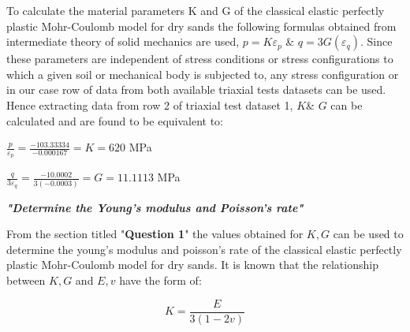 \documentclass{article}
\begin{document}
\begin{par}
\begin{flushleft}
To calculate the material parameters K and G of the classical elastic perfectly plastic Mohr-Coulomb model for dry sands the following formulas obtained from intermediate theory of solid mechanics are used, $p=K\varepsilon_{p}$ \& $q=3G(\varepsilon_{q})$. Since these parameters are independent of stress conditions or stress configurations to which a given soil or mechanical body is subjected to, any stress configuration or in our case row of data from both available triaxial tests datasets can be used. Hence extracting data from row 2 of triaxial test dataset 1, $K$\& $G$ can be calculated and are found to be equivalent to:
\end{flushleft}
\end{par}

\begin{par}
\begin{center}
$\frac{p}{\varepsilon_{p}}=\frac{-103.33334}{-0.000167}=K=620$ MPa
\end{center}
\end{par}

\begin{par}
\begin{center}
$\frac{q}{3\varepsilon_{q}}=\frac{-10.0002}{3(-0.0003)}=G=11.1113$ MPa
\end{center}
\end{par}


\label{H_983A54DB}

\begin{par}
\begin{flushleft}
\textit{\textbf{"Determine the Young’s modulus and Poisson’s rate"}}
\end{flushleft}
\end{par}

\begin{par}
\begin{flushleft}
From the section titled "\textbf{Question 1}" the values obtained for $K,G$ can be used to determine the young's modulus and poisson's rate of the classical elastic perfectly plastic Mohr-Coulomb model for dry sands. It is known that the relationship between $K,G$ and $E,v$ have the form of:
\end{flushleft}
\end{par}

\begin{par}
$$K=\frac{E}{3(1-2v)}$$
\end{par}
\end{document}
